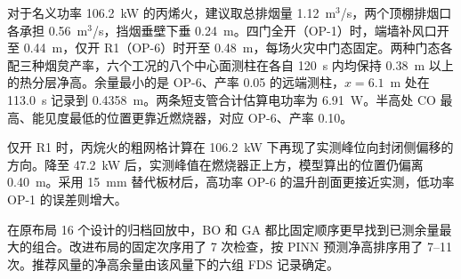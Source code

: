 对于名义功率 106.2~kW 的丙烯火，建议取总排烟量 1.12~m$^3$/s，两个顶棚排烟口各承担 0.56~m$^3$/s，挡烟垂壁下垂 0.24~m。四门全开（OP-1）时，端墙补风口开至 0.44~m，仅开 R1（OP-6）时开至 0.48~m，每场火灾中门态固定。两种门态各配三种烟炱产率，六个工况的八个中心面测柱在各自 120~s 内均保持 0.38~m 以上的热分层净高。余量最小的是 OP-6、产率 0.05 的远端测柱，$x=6.1$~m 处在 113.0~s 记录到 0.4358~m。两条短支管合计估算电功率为 6.91~W。半高处 CO 最高、能见度最低的位置更靠近燃烧器，对应 OP-6、产率 0.10。

仅开 R1 时，丙烷火的粗网格计算在 106.2~kW 下再现了实测峰位向封闭侧偏移的方向。降至 47.2~kW 后，实测峰值在燃烧器正上方，模型算出的位置仍偏离 0.40~m。采用 15~mm 替代板材后，高功率 OP-6 的温升剖面更接近实测，低功率 OP-1 的误差则增大。

在原布局 16 个设计的归档回放中，BO 和 GA 都比固定顺序更早找到已测余量最大的组合。改进布局的固定次序用了 7 次检查，按 PINN 预测净高排序用了 7--11 次。推荐风量的净高余量由该风量下的六组 FDS 记录确定。
